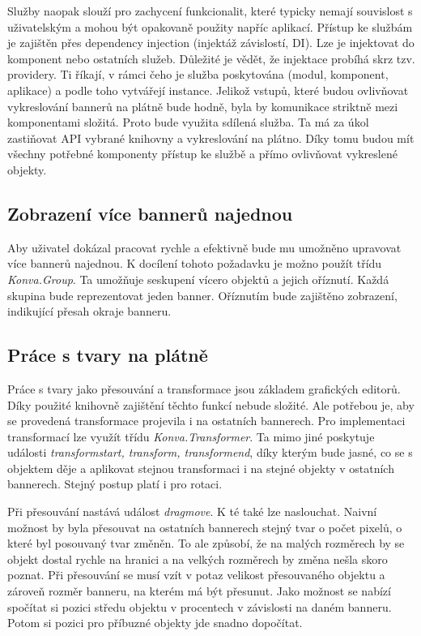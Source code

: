     Služby naopak slouží pro zachycení funkcionalit, které typicky nemají souvislost s uživatelským a mohou být opakovaně použity napříc aplikací.
    Přístup ke službám je zajištěn přes dependency injection (injektáž závislostí, DI). Lze je injektovat do komponent nebo ostatních služeb.
    Důležité je vědět, že injektace probíhá skrz tzv. providery. Ti říkají, v rámci čeho je služba poskytována (modul, komponent, aplikace) a
    podle toho vytvářejí instance. Jelikož vstupů, které budou ovlivňovat vykreslování bannerů na plátně bude hodně,
    byla by komunikace striktně mezi komponentami složitá. Proto bude využita sdílená služba.
    Ta má za úkol zastiňovat API vybrané knihovny a vykreslování na plátno. Díky tomu budou mít všechny potřebné komponenty přístup ke službě a
    přímo ovlivňovat vykreslené objekty.

        \subsection{Zobrazení více bannerů najednou}
        Aby uživatel dokázal pracovat rychle a efektivně bude mu umožněno upravovat více bannerů najednou. K docílení tohoto požadavku je možno použít
        třídu \emph{Konva.Group}. Ta umožňuje seskupení vícero objektů a jejich oříznutí.
        Každá skupina bude reprezentovat jeden banner. Oříznutím bude zajištěno zobrazení, indikující přesah okraje banneru.

        \subsection{Práce s tvary na plátně}
        Práce s tvary jako přesouvání a transformace jsou základem grafických editorů. Díky použité knihovně zajištění těchto funkcí nebude složité.
        Ale potřebou je, aby se provedená transformace projevila i na ostatních bannerech. Pro implementaci transformací lze využít třídu \emph{Konva.Transformer}.
        Ta mimo jiné poskytuje události \emph{transformstart, transform, transformend}, díky kterým bude jasné, co se s objektem děje a aplikovat stejnou transformaci i
        na stejné objekty v ostatních bannerech. Stejný postup platí i pro rotaci.

        Při přesouvání nastává událost \emph{dragmove}. K té také lze naslouchat. Naivní možnost by byla přesouvat na ostatních bannerech stejný tvar o počet pixelů,
        o které byl posouvaný tvar změněn. To ale způsobí, že na malých rozměrech by se objekt dostal rychle na hranici a na velkých rozměrech by
        změna nešla skoro poznat. Při přesouvání se musí vzít v potaz velikost přesouvaného objektu a zároveň rozměr banneru, na kterém má být přesunut.
        Jako možnost se nabízí spočítat si pozici středu objektu v procentech v závislosti na daném banneru.
        Potom si pozici pro příbuzné objekty jde snadno dopočítat.

